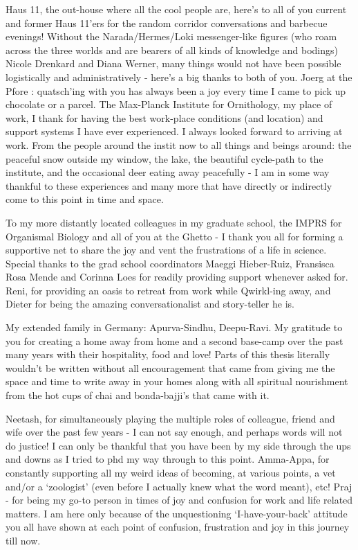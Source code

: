\documentclass[
]{book}
\begin{document}
Haus 11, the out-house where all the cool people are, here's to all of you current and former Haus 11'ers for the random corridor conversations and barbecue evenings! Without the Narada/Hermes/Loki messenger-like figures (who roam across the three worlds and are bearers of all kinds of knowledge and bodings) Nicole Drenkard and Diana Werner, many things would not have been possible logistically and administratively - here's a big thanks to both of you. Joerg at the Pfore : quatsch'ing with you has always been a joy every time I came to pick up chocolate or a parcel. The Max-Planck Institute for Ornithology, my place of work, I thank for having the best work-place conditions (and location) and support systems I have ever experienced. I always looked forward to arriving at work. From the people around the instit now to all things and beings around: the peaceful snow outside my window, the lake, the beautiful cycle-path to the institute, and the occasional deer eating away peacefully - I am in some way thankful to these experiences and many more that have directly or indirectly come to this point in time and space.

To my more distantly located colleagues in my graduate school, the IMPRS for Organismal Biology and all of you at the Ghetto - I thank you all for forming a supportive net to share the joy and vent the frustrations of a life in science. Special thanks to the grad school coordinators Maeggi Hieber-Ruiz, Fransisca Rosa Mende and Corinna Loes for readily providing support whenever asked for. Reni, for providing an oasis to retreat from work while Qwirkl-ing away, and Dieter for being the amazing conversationalist and story-teller he is.

My extended family in Germany: Apurva-Sindhu, Deepu-Ravi. My gratitude to you for creating a home away from home and a second base-camp over the past many years with their hospitality, food and love! Parts of this thesis literally wouldn't be written without all encouragement that came from giving me the space and time to write away in your homes along with all spiritual nourishment from the hot cups of chai and bonda-bajji's that came with it.

Neetash, for simultaneously playing the multiple roles of colleague, friend and wife over the past few years - I can not say enough, and perhaps words will not do justice! I can only be thankful that you have been by my side through the ups and downs as I tried to phd my way through to this point. Amma-Appa, for constantly supporting all my weird ideas of becoming, at various points, a vet and/or a `zoologist' (even before I actually knew what the word meant), etc! Praj - for being my go-to person in times of joy and confusion for work and life related matters. I am here only because of the unquestioning `I-have-your-back' attitude you all have shown at each point of confusion, frustration and joy in this journey till now.
\end{document}
